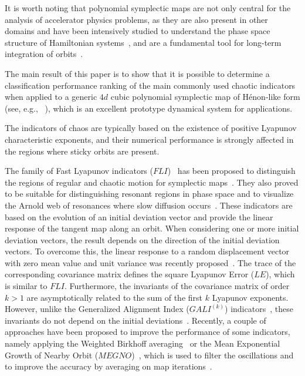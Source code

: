 It is worth noting that polynomial symplectic maps are not only central for the analysis of accelerator physics problems, as they are also present in other domains and have been intensively studied to understand the phase space structure of Hamiltonian systems~\cite{Turaev2003}, and are a fundamental tool for long-term integration of orbits~\cite{Bazzani:262179}. 

The main result of this paper is to show that it is possible to determine a classification performance ranking of the main commonly used chaotic indicators when applied to a generic $4d$ cubic polynomial symplectic map of H\'enon-like form (see, e.g., ~\cite{Bazzani:262179}), which is an excellent prototype dynamical system for applications.

The indicators of chaos are typically based on the existence of positive Lyapunov characteristic exponents, and their numerical performance is strongly affected in the regions where sticky orbits are present.

The family of Fast Lyapunov indicators ($FLI$)~\cite{Froeschle1997} has been proposed to distinguish the regions of regular and chaotic motion for symplectic maps~\cite{SZEZECH2005394}. They also proved to be suitable for distinguishing resonant regions in phase space and to visualize the Arnold web of resonances where slow diffusion occurs~\cite{Arnold:937549}. These indicators are based on the evolution of an initial deviation vector and provide the linear response of the tangent map along an orbit. When considering one or more initial deviation vectors, the result depends on the direction of the initial deviation vectors. To overcome this, the linear response to a random displacement vector with zero mean value and unit variance was recently proposed~\cite{Turchetti2017}. The trace of the corresponding covariance matrix defines the square Lyapunov Error ($LE$), which is similar to $FLI$. Furthermore, the invariants of the covariance matrix of order $k>1$ are asymptotically related to the sum of the first $k$ Lyapunov exponents. However, unlike the Generalized Alignment Index ($GALI^{(k)}$) indicators~\cite{Bountis2007,Skokos2015}, these invariants do not depend on the initial deviations~\cite{Skokos2008}. Recently, a couple of approaches have been proposed to improve the performance of some indicators, namely applying the Weighted Birkhoff averaging~\cite{Das_2017} or the Mean Exponential Growth of Nearby Orbit ($MEGNO$)~\cite{Cincotta1996}, which is used to filter the oscillations and to improve the accuracy by averaging on map iterations~\cite{Gozdziewski01,Mestre2011}.

